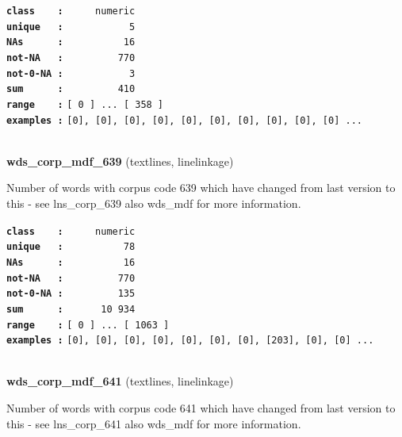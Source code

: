 \documentclass[]{article}
\begin{document}
\textbf{\texttt{class\ \ \ \ :}} \texttt{~~~~~numeric}\\
\textbf{\texttt{unique\ \ \ :}} \texttt{~~~~~~~~~~~5}\\
\textbf{\texttt{NAs\ \ \ \ \ \ :}} \texttt{~~~~~~~~~~16}\\
\textbf{\texttt{not-NA\ \ \ :}} \texttt{~~~~~~~~~770}\\
\textbf{\texttt{not-0-NA\ :}} \texttt{~~~~~~~~~~~3}\\
\textbf{\texttt{sum\ \ \ \ \ \ :}} \texttt{~~~~~~~~~410}\\
\textbf{\texttt{range\ \ \ \ :}}
\texttt{{[}\ 0\ {]}\ ...\ {[}\ 358\ {]}}\\
\textbf{\texttt{examples\ :}}
\texttt{{[}0{]},\ {[}0{]},\ {[}0{]},\ {[}0{]},\ {[}0{]},\ {[}0{]},\ {[}0{]},\ {[}0{]},\ {[}0{]},\ {[}0{]}\ ...}\\

~

\textbf{wds\_corp\_mdf\_639} (textlines, linelinkage)

Number of words with corpus code 639 which have changed from last
version to this - see lns\_corp\_639 also wds\_mdf for more information.

\textbf{\texttt{class\ \ \ \ :}} \texttt{~~~~~numeric}\\
\textbf{\texttt{unique\ \ \ :}} \texttt{~~~~~~~~~~78}\\
\textbf{\texttt{NAs\ \ \ \ \ \ :}} \texttt{~~~~~~~~~~16}\\
\textbf{\texttt{not-NA\ \ \ :}} \texttt{~~~~~~~~~770}\\
\textbf{\texttt{not-0-NA\ :}} \texttt{~~~~~~~~~135}\\
\textbf{\texttt{sum\ \ \ \ \ \ :}} \texttt{~~~~~~10~934}\\
\textbf{\texttt{range\ \ \ \ :}}
\texttt{{[}\ 0\ {]}\ ...\ {[}\ 1063\ {]}}\\
\textbf{\texttt{examples\ :}}
\texttt{{[}0{]},\ {[}0{]},\ {[}0{]},\ {[}0{]},\ {[}0{]},\ {[}0{]},\ {[}0{]},\ {[}203{]},\ {[}0{]},\ {[}0{]}\ ...}\\

~

\textbf{wds\_corp\_mdf\_641} (textlines, linelinkage)

Number of words with corpus code 641 which have changed from last
version to this - see lns\_corp\_641 also wds\_mdf for more information.
\end{document}
